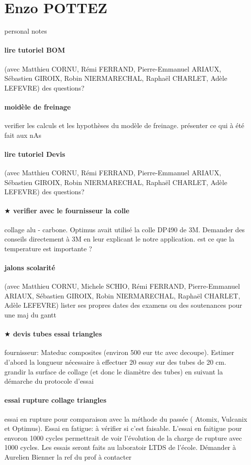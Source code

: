  
 \newpage \section*{Enzo POTTEZ} 
 \par personal notes
\paragraph{lire tutoriel BOM} (avec Matthieu CORNU, Rémi FERRAND, Pierre-Emmanuel ARIAUX, Sébastien GIROIX, Robin NIERMARECHAL, Raphaël CHARLET, Adèle LEFEVRE) des questions?
\paragraph{moidèle de freinage} verifier les calculs et les hypothèses du modèle de freinage. présenter ce qui à été fait aux nAs
\paragraph{lire tutoriel Devis} (avec Matthieu CORNU, Rémi FERRAND, Pierre-Emmanuel ARIAUX, Sébastien GIROIX, Robin NIERMARECHAL, Raphaël CHARLET, Adèle LEFEVRE) des questions?
\paragraph{$\bigstar$ verifier avec le fournisseur la colle} collage alu - carbone. Optimus avait utilisé la colle DP490 de 3M. Demander des conseils directement à 3M en leur explicant le notre application. est ce que la temperature est importante ?
\paragraph{jalons scolarité} (avec Matthieu CORNU, Michele SCHIO, Rémi FERRAND, Pierre-Emmanuel ARIAUX, Sébastien GIROIX, Robin NIERMARECHAL, Raphaël CHARLET, Adèle LEFEVRE) lister ses propres dates des examens ou des soutenances pour une maj du gantt
\paragraph{$\bigstar$ devis tubes essai triangles} fournisseur: Mateduc composites (environ 500 eur ttc avec decoupe). Estimer d'abord la longueur nécessaire à effectuer 20 essay sur des tubes de 20 cm. grandir la surface de collage (et donc le diamètre des tubes) en suivant la démarche du protocole d'essai
\paragraph{essai rupture collage triangles} essai en rupture pour comparaison avec la méthode du passée ( Atomix, Vulcanix et Optimus). Essai en fatigue: à vérifier si c'est faisable. L'essai en faitigue pour envoron 1000 cycles permettrait de voir l'évolution de la charge de rupture avec 1000 cycles. Les essais seront faits au laboratoir LTDS de l'école. Démander à Aurelien Bienner la ref du prof à contacter
